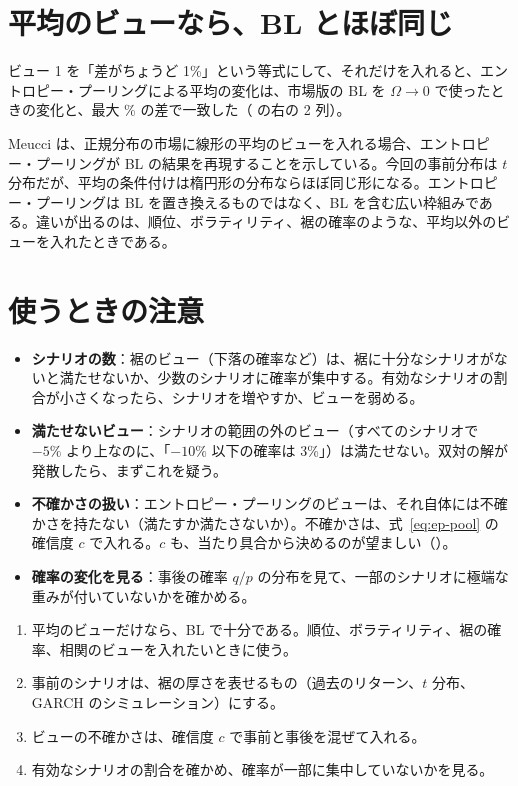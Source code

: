 \section{平均のビューなら、BL とほぼ同じ}

ビュー 1 を「差がちょうど 1\%」という等式にして、それだけを入れると、エントロピー・プーリングによる平均の変化は、市場版の BL を $\Omega\to0$ で使ったときの変化と、最大 \% の差で一致した（ の右の 2 列）。

Meucci は、正規分布の市場に線形の平均のビューを入れる場合、エントロピー・プーリングが BL の結果を再現することを示している。今回の事前分布は $t$ 分布だが、平均の条件付けは楕円形の分布ならほぼ同じ形になる。エントロピー・プーリングは BL を置き換えるものではなく、BL を含む広い枠組みである。違いが出るのは、順位、ボラティリティ、裾の確率のような、平均以外のビューを入れたときである。

\section{使うときの注意}

\begin{itemize}
\item \textbf{シナリオの数}：裾のビュー（下落の確率など）は、裾に十分なシナリオがないと満たせないか、少数のシナリオに確率が集中する。有効なシナリオの割合が小さくなったら、シナリオを増やすか、ビューを弱める。
\item \textbf{満たせないビュー}：シナリオの範囲の外のビュー（すべてのシナリオで $-5\%$ より上なのに、「$-10\%$ 以下の確率は 3\%」）は満たせない。双対の解が発散したら、まずこれを疑う。
\item \textbf{不確かさの扱い}：エントロピー・プーリングのビューは、それ自体には不確かさを持たない（満たすか満たさないか）。不確かさは、式~\eqref{eq:ep-pool} の確信度 $c$ で入れる。$c$ も、当たり具合から決めるのが望ましい（）。
\item \textbf{確率の変化を見る}：事後の確率 $q/p$ の分布を見て、一部のシナリオに極端な重みが付いていないかを確かめる。
\end{itemize}

\begin{tipbox}
\begin{enumerate}
\item 平均のビューだけなら、BL で十分である。順位、ボラティリティ、裾の確率、相関のビューを入れたいときに使う。
\item 事前のシナリオは、裾の厚さを表せるもの（過去のリターン、$t$ 分布、GARCH のシミュレーション）にする。
\item ビューの不確かさは、確信度 $c$ で事前と事後を混ぜて入れる。
\item 有効なシナリオの割合を確かめ、確率が一部に集中していないかを見る。
\end{enumerate}
\end{tipbox}

